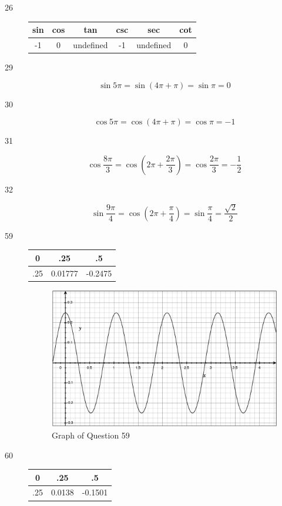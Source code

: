 \documentclass[fleqn,addpoints]{exam}
\begin{document}
\begin{description}
\item[26]
\begin{tabular}{cccccc}
\toprule
sin & cos & tan        & csc & sec       & cot  \\
\midrule
-1   & 0   & undefined  & -1   & undefined & 0 \\
\bottomrule
\end{tabular}

\item[29]
\[
  \sin 5\pi = \sin(4 \pi + \pi) = \sin \pi = 0
\]

\item[30]
\[
  \cos 5\pi = \cos(4 \pi + \pi) = \cos \pi = -1
\]

\item[31]
\[
  \cos \frac{8 \pi}{3} = \cos \left( 2 \pi + \frac{2 \pi}{3} \right) = \cos \frac{2 \pi}{3} = -\frac{1}{2}
\]

\item[32]
\[
  \sin \frac{9 \pi}{4} = \cos \left( 2 \pi + \frac{\pi}{4} \right) = \sin \frac{\pi}{4} = \frac{\sqrt{2}}{2}
\]

\item[59]
\begin{tabular}{ccc}
\toprule
0 & .25 & .5 \\
\midrule
.25 & 0.01777 & -0.2475 \\
\bottomrule
\end{tabular}

\begin{figure}[H]
  \centering
  \includegraphics[scale=.3]{question59.eps}
  \caption*{Graph of Question 59}
\end{figure}

\item[60]
\begin{tabular}{ccc}
\toprule
0 & .25 & .5 \\
\midrule
.25 & 0.0138 & -0.1501 \\
\bottomrule
\end{tabular}


\end{description}
\end{document}
